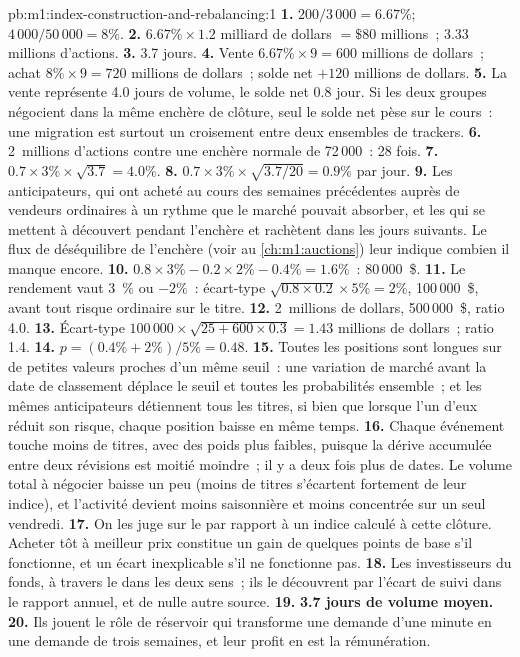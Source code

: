 \begin{solution}{pb:m1:index-construction-and-rebalancing:1}
\textbf{1.} $200/3\,000 = 6.67\%$; $4\,000/50\,000 = 8\%$.
\textbf{2.} $6.67\% \times 1.2$ milliard de dollars $= \$80$ millions~; 3.33 millions d'actions.
\textbf{3.} 3.7 jours.
\textbf{4.} Vente $6.67\% \times 9 = 600$ millions de dollars~; achat $8\% \times 9 =
720$ millions de dollars~; solde net $+120$ millions de dollars.
\textbf{5.} La vente représente 4.0 jours de volume, le solde net 0.8 jour. Si les deux groupes
négocient dans la même enchère de clôture, seul le solde net pèse sur le cours~: une
migration est surtout un croisement entre deux ensembles de trackers.
\textbf{6.} 2~millions d'actions contre une enchère normale de 72\,000~: 28 fois.
\textbf{7.} $0.7 \times 3\% \times \sqrt{3.7} = 4.0\%$.
\textbf{8.} $0.7 \times 3\% \times \sqrt{3.7/20} = 0.9\%$ par jour.
\textbf{9.} Les anticipateurs, qui ont acheté au cours des semaines précédentes
auprès de vendeurs ordinaires à un rythme que le marché pouvait absorber, et les  qui
se mettent à découvert pendant l'enchère et rachètent dans les jours suivants. Le flux de
déséquilibre de l'enchère (voir au \cref{ch:m1:auctions}) leur indique combien il manque encore.
\textbf{10.} $0.8 \times 3\% - 0.2 \times 2\% - 0.4\% = 1.6\%$~: 80\,000~\$.
\textbf{11.} Le rendement vaut 3~\% ou $-2\%$~: écart-type $\sqrt{0.8
\times 0.2} \times 5\% = 2\%$, 100\,000~\$, avant tout risque ordinaire sur le titre.
\textbf{12.} 2~millions de dollars, 500\,000~\$, ratio 4.0.
\textbf{13.} Écart-type $100\,000 \times \sqrt{25 + 600 \times 0.3} =
1.43$ millions de dollars~; ratio 1.4.
\textbf{14.} $p = (0.4\% + 2\%)/5\% = 0.48$.
\textbf{15.} Toutes les positions sont longues sur de petites valeurs proches d'un même seuil~: une
variation de marché avant la date de classement déplace le seuil et toutes les
probabilités ensemble~; et les mêmes anticipateurs détiennent tous les titres, si bien que
lorsque l'un d'eux réduit son risque, chaque position baisse en même temps.
\textbf{16.} Chaque événement touche moins de titres, avec des poids plus faibles, puisque la
dérive accumulée entre deux révisions est moitié moindre~; il y a deux fois plus de dates.
Le volume total à négocier baisse un peu (moins de titres s'écartent fortement de leur indice),
et l'activité devient moins saisonnière et moins concentrée sur un seul vendredi.
\textbf{17.} On les juge sur le  par rapport à un indice calculé à
cette clôture. Acheter tôt à meilleur prix constitue un gain de quelques points de base
s'il fonctionne, et un écart inexplicable s'il ne fonctionne pas.
\textbf{18.} Les investisseurs du fonds, à travers le  dans les deux
sens~; ils le découvrent par l'écart de suivi dans le rapport annuel,
et de nulle autre source.
\textbf{19.} \textbf{3.7 jours de volume moyen.}
\textbf{20.} Ils jouent le rôle de réservoir qui transforme une demande d'une minute en une
demande de trois semaines, et leur profit en est la rémunération.
\end{solution}

